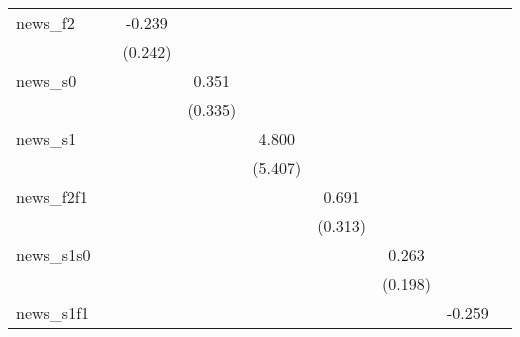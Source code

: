 {\begin{tabular}{l*{8}{c}}
\addlinespace
news\_f2     &                     &      -0.239         &                     &                     &                     &                     &                     &                     \\
            &                     &     (0.242)         &                     &                     &                     &                     &                     &                     \\
\addlinespace
news\_s0     &                     &                     &       0.351         &                     &                     &                     &                     &                     \\
            &                     &                     &     (0.335)         &                     &                     &                     &                     &                     \\
\addlinespace
news\_s1     &                     &                     &                     &       4.800         &                     &                     &                     &                     \\
            &                     &                     &                     &     (5.407)         &                     &                     &                     &                     \\
\addlinespace
news\_f2f1   &                     &                     &                     &                     &       0.691\sym{**} &                     &                     &                     \\
            &                     &                     &                     &                     &     (0.313)         &                     &                     &                     \\
\addlinespace
news\_s1s0   &                     &                     &                     &                     &                     &       0.263         &                     &                     \\
            &                     &                     &                     &                     &                     &     (0.198)         &                     &                     \\
\addlinespace
news\_s1f1   &                     &                     &                     &                     &                     &                     &      -0.259         &                     \\

\end{tabular}}
